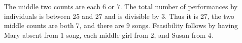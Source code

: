 The middle two counts are each 6 or 7. The total number of performances by individuals is between 25 and 27 and is divisible by 3. Thus it is 27, the two middle counts are both 7, and there are $\boxed9$ songs. Feasibility follows by having Mary absent from 1 song, each middle girl from 2, and Susan from 4.
